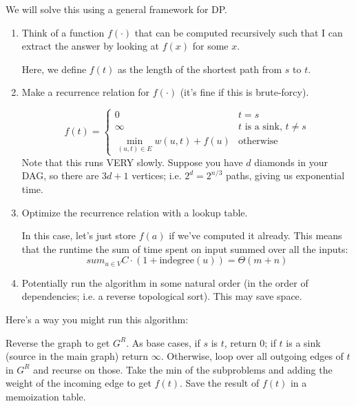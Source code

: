 We will solve this using a general framework for DP.
\begin{enumerate}
    \item Think of a function $f(\cdot)$ that can be computed recursively such that I can extract the answer by looking at
    $f(x)$ for some $x$.

    Here, we define $f(t)$ as the length of the shortest path from $s$ to $t$.

    \item Make a recurrence relation for $f(\cdot)$ (it's fine if this is brute-forcy).
    
    \[ f(t) = \begin{cases}
        0 & t = s \\
        \infty & \text{$t$ is a sink, $t \neq s$} \\
        \min_{(u, t) \in E} w(u, t) + f(u) & \text{otherwise}
    \end{cases}\]    
    Note that this runs VERY slowly. Suppose you have $d$ diamonds in your DAG, so there are $3d + 1$ vertices; i.e. $2^d = 2^{n/3}$ paths, giving us exponential time.

    \item Optimize the recurrence relation with a lookup table. 
    
    In this case, let's just store $f(a)$ if we've computed it already. This means that the runtime the sum of time spent on input summed over all the inputs:
    \[ sum_{u \in V} C \cdot (1 + \text{indegree}(u)) = \Theta(m + n) \]

    \item Potentially run the algorithm in some natural order (in the order of dependencies; i.e. a reverse topological sort).
    This may save space.
\end{enumerate}

Here's a way you might run this algorithm:
\begin{algothm}
    Reverse the graph to get $G^R$.
    As base cases, if $s$ is $t$, return 0; if $t$ is a sink (source in the main graph) return $\infty$.
    Otherwise, loop over all outgoing edges of $t$ in $G^R$ and recurse on those. Take the min of the subproblems and adding the weight of the incoming edge to get $f(t)$.
    Save the result of $f(t)$ in a memoization table.
\end{algothm}